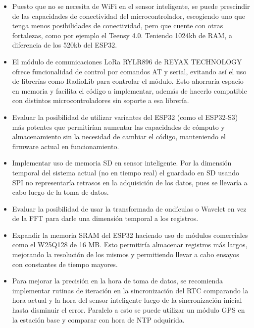 \begin{itemize}
 \item Puesto que no se necesita de WiFi en el sensor inteligente, se puede prescindir de las capacidades de conectividad del microcontrolador, escogiendo uno que tenga menos posibilidades de conectividad, pero que cuente con otras fortalezas, como por ejemplo el Teensy 4.0. Teniendo 1024kb de RAM, a diferencia de los 520kb del ESP32.
 
 \item El módulo de comunicaciones LoRa RYLR896 de REYAX TECHNOLOGY ofrece funcionalidad de control por comandos AT y serial, evitando así el uso de librerías como RadioLib para controlar el módulo. Esto ahorraría espacio en memoria y facilita el código a implementar, además de hacerlo compatible con distintos microcontroladores sin soporte a esa librería.
 
 \item  Evaluar la posibilidad de utilizar variantes del ESP32 (como el ESP32-S3) más potentes que permitirían aumentar las capacidades de cómputo y almacenamiento sin la necesidad de cambiar el código, manteniendo el firmware actual en funcionamiento.
 
 \item Implementar uso de memoria SD en sensor inteligente. Por la dimensión temporal del sistema actual (no en tiempo real) el guardado en SD usando SPI no representaría retrasos en la adquisición de los datos, pues se llevaría a cabo luego de la toma de datos.
 
 \item Evaluar la posibilidad de usar la transformada de ondículas o Wavelet en vez de la FFT para darle una dimensión temporal a los registros.
 
 \item Expandir la memoria SRAM del ESP32 haciendo uso de módulos comerciales como el W25Q128 de 16 MB. Esto permitiría almacenar registros más largos, mejorando la resolución de los mismos y permitiendo llevar a cabo ensayos con constantes de tiempo mayores.
 
 \item Para mejorar la precisión en la hora de toma de datos, se recomienda implementar rutinas de iteración en la sincronización del RTC comparando la hora actual y la hora del sensor inteligente luego de la sincronización inicial hasta disminuir el error. Paralelo a esto se puede utilizar un módulo GPS en la estación base y comparar con hora de NTP adquirida.
\end{itemize}